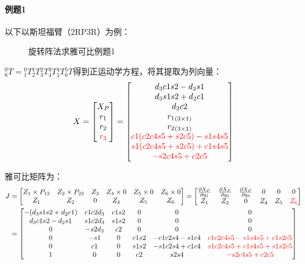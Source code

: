 \documentclass[
12pt, %
a4paper, 
oneside, %
headinclude,footinclude, %
]{scrartcl}
\begin{document}
\paragraph{例题1}
{\footnotesize
以下以斯坦福臂（2RP3R）为例：

\begin{figure}[H]
\centering
\subfloat[斯坦福臂结构图]{\texttt{[image: 4.1]}} \quad
\subfloat[参数表]{\texttt{[image: 4.2]}}
\caption{旋转阵法求雅可比例题1}
\end{figure}

$ {}_6^0 T = {{}_1^0 T}{{}_2^1 T}{{}_3^2 T}{{}_4^3 T}{{}_5^4 T}{{}_6^5 T} $得到正运动学方程，将其提取为列向量：
$$ X = \begin{bmatrix} X_P \\ r_1 \\ r_2 \\ \textcolor{red}{r_3} \end{bmatrix} = \begin{bmatrix} d_3 c1 s2 - d_2 s1 \\ d_3 s1 s2 + d_2 c1 \\ d_3 c2 \\ {r_1}_{(3 \times 1)} \\ {r_2}_{(3 \times 1)} \\ \textcolor{red}{c1(c2 c4 s5 + s2 c5) - s1 s4 s5} \\ \textcolor{red}{s1(c2 c4 s5 + s2 c5) + c1 s4 s5} \\ \textcolor{red}{-s2 c4 s5 + c2 c5} \end{bmatrix} $$

雅可比矩阵为：
\begin{align*}
J &= \begin{bmatrix} Z_1 \times P_{13} & Z_2 \times P_{23} & Z_3 & Z_4 \times 0 & Z_5 \times 0 & Z_6 \times 0 \\ Z_1 & Z_2 & 0 & Z_4 & Z_5 & Z_6 \end{bmatrix}
= \begin{bmatrix} \frac{\partial X_P}{\partial q_1} & \frac{\partial X_P}{\partial q_2} & \frac{\partial X_P}{\partial q_3} & 0 & 0 & 0 \\ Z_1 & Z_2 & 0 & Z_4 & Z_5 & \textcolor{red}{Z_6} \end{bmatrix} \\
&= \begin{bmatrix} -(d_3 s1 s2 + d_2 c1) & c1 c2 d_3 & c1 s2 & 0 & 0 & 0 \\ d_3 c1 s2 - d_2 s1 & s1 c2 d_3 & s1 s2 & 0 & 0 & 0 \\ 0 & -s2 d_3 & c2 & 0 & 0 & 0 \\ 0 & -s1 & 0 & c1 s2 & -c1 c2 s4 - s1 c4 & \textcolor{red}{c1 c2 c4 s5 - s1 s4 s5 + c1 s2 c5} \\ 0 & c1 & 0 & s1 s2 & -s1 c2 s4 + c1 c4 & \textcolor{red}{s1 c2 c4 s5 + c1 s4 s5 + s1 s2 c5} \\ 1 & 0 & 0 & c2 & s2 s4 & \textcolor{red}{-s2 c4 s5 + c2 c5} \end{bmatrix}
\end{align*}

}
\end{document}
